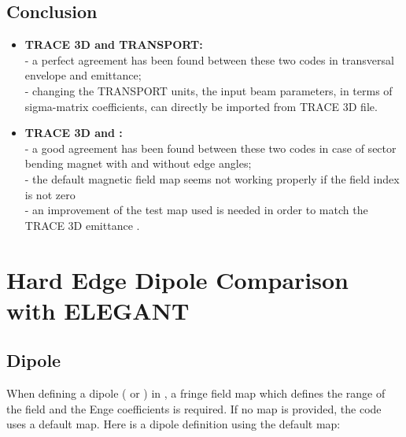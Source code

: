 \clearpage


\subsection{Conclusion}
\label{sec:conclusion}

\begin{itemize}

\item \textbf{TRACE 3D and TRANSPORT:} \\
- a perfect agreement has been found between these two codes in transversal envelope and emittance; \\
- changing the TRANSPORT units, the input beam parameters, in terms of sigma-matrix coefficients, can directly be imported from TRACE 3D file.

\item \textbf{TRACE 3D and \opalt:} \\
- a good agreement has been found between these two codes in case of sector bending magnet with and without edge angles;\\
- the default magnetic field map seems not working properly if the field index is not zero\\
- an improvement of the test map used is needed in order to match the TRACE 3D emittance .
\end{itemize}


\section{Hard Edge Dipole Comparison with ELEGANT}

\subsection{\opal Dipole}
When defining a dipole ( or ) in \opal,  a fringe field map which defines the range of the field and the Enge coefficients is required. If no map is provided, the code uses a default map. Here is a dipole definition using the default map:

